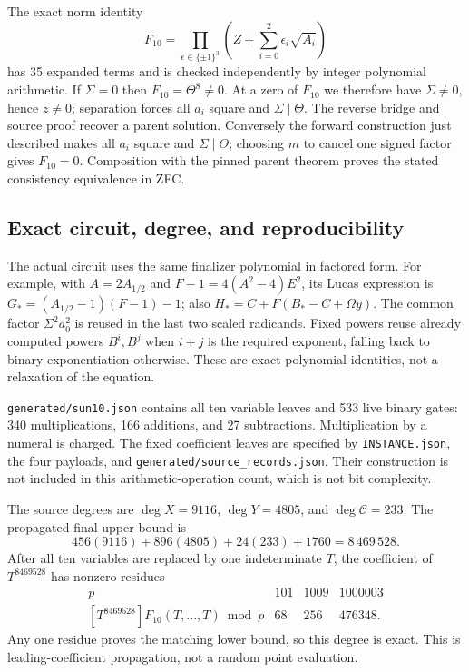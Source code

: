 The exact norm identity
\[
 F_{10}=\prod_{\epsilon\in\{\pm1\}^3}
 \left(Z+\sum_{i=0}^2\epsilon_i\sqrt{A_i}\right)
\]
has 35 expanded terms and is checked independently by integer polynomial
arithmetic. If $\Sigma=0$ then $F_{10}=\Theta^8\ne0$. At a zero of
$F_{10}$ we therefore have $\Sigma\ne0$, hence $z\ne0$; separation forces
all $a_i$ square and $\Sigma\mid\Theta$. The reverse bridge and source
proof recover a parent solution. Conversely the forward construction
just described makes all $a_i$ square and $\Sigma\mid\Theta$; choosing
$m$ to cancel one signed factor gives $F_{10}=0$. Composition with the
pinned parent theorem proves the stated consistency equivalence in ZFC.


\subsection{Exact circuit, degree, and reproducibility}

The actual circuit uses the same finalizer polynomial in factored form.
For example, with $A=2A_{1/2}$ and $F-1=4(A^2-4)E^2$, its Lucas expression
is $G_*=(A_{1/2}-1)(F-1)-1$; also
$H_*=C+F(B_*-C+\Omega y)$. The common factor
$\Sigma^2a_0^2$ is reused in the last two scaled radicands.
Fixed powers reuse already computed powers $B^i,B^j$ when $i+j$ is the
required exponent, falling back to binary exponentiation otherwise.
These are exact polynomial identities, not a relaxation of the equation.

\texttt{generated/sun10.json} contains all ten variable leaves and 533
live binary gates: 340 multiplications, 166 additions, and 27 subtractions.
Multiplication by a numeral is charged. The fixed coefficient leaves are
specified by \texttt{INSTANCE.json}, the four payloads, and
\texttt{generated/source\_records.json}. Their construction is not included
in this arithmetic-operation count, which is not bit complexity.

The source degrees are $\deg X=9116$, $\deg Y=4805$, and
$\deg\mathcal C=233$. The propagated final upper bound is
\[
 456(9116)+896(4805)+24(233)+1760=8\,469\,528.
\]
After all ten variables are replaced by one indeterminate $T$, the
coefficient of $T^{8469528}$ has nonzero residues
\[
 \begin{array}{c|ccc}
 p&101&1009&1000003\\\hline
 [T^{8469528}]F_{10}(T,\ldots,T)\bmod p&68&256&476348.
 \end{array}
\]
Any one residue proves the matching lower bound, so this degree is exact.
This is leading-coefficient propagation, not a random point evaluation.

